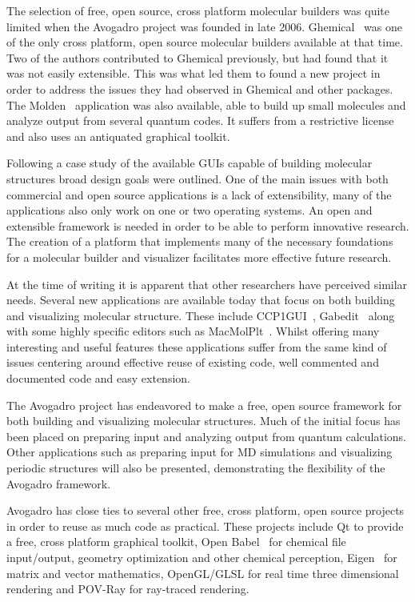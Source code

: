 \documentclass{article}
\begin{document}
The selection of free, open source, cross platform molecular builders was quite limited when the Avogadro project was founded in late 2006. Ghemical~\cite{Ghemical} was one of the only cross platform, open source molecular builders available at that time. Two of the authors contributed to Ghemical previously, but had found that it was not easily extensible. This was what led them to found a new project in order to address the issues they had observed in Ghemical and other packages. The Molden~\cite{Molden} application was also available, able to build up small molecules and analyze output from several quantum codes. It suffers from a restrictive license and also uses an antiquated graphical toolkit.

Following a case study of the available GUIs capable of building molecular structures broad design goals were outlined. One of the main issues with both commercial and open source applications is a lack of extensibility, many of the applications also only work on one or two operating systems. An open and extensible framework is needed in order to be able to perform innovative research. The creation of a platform that implements many of the necessary foundations for a molecular builder and visualizer facilitates more effective future research.

At the time of writing it is apparent that other researchers have perceived similar needs. Several new applications are available today that focus on both building and visualizing molecular structure. These include CCP1GUI~\cite{CCP1GUI}, Gabedit~\cite{Gabedit} along with some highly specific editors such as MacMolPlt~\cite{MacMolPlt}. Whilst offering many interesting and useful features these applications suffer from the same kind of issues centering around effective reuse of existing code, well commented and documented code and easy extension.

The Avogadro project has endeavored to make a free, open source framework for both building and visualizing molecular structures. Much of the initial focus has been placed on preparing input and analyzing output from quantum calculations. Other applications such as preparing input for MD simulations and visualizing periodic structures will also be presented, demonstrating the flexibility of the Avogadro framework.

Avogadro has close ties to several other free, cross platform, open source projects in order to reuse as much code as practical. These projects include Qt to provide a free, cross platform graphical toolkit, Open Babel~\cite{OpenBabel} for chemical file input/output, geometry optimization and other chemical perception, Eigen~\cite{Eigen} for matrix and vector mathematics, OpenGL/GLSL for real time three dimensional rendering and POV-Ray for ray-traced rendering.
\end{document}
